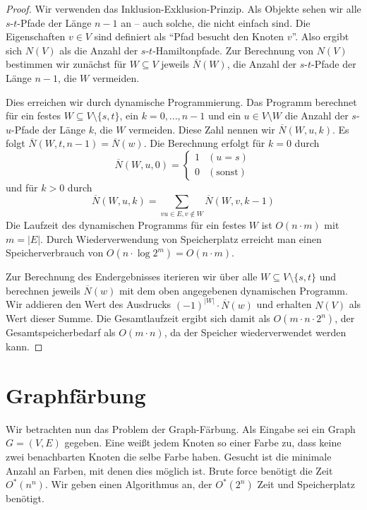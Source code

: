   \begin{proof}
    Wir verwenden das Inklusion-Exklusion-Prinzip. Als Objekte sehen wir alle \(s\)-\(t\)-Pfade der Länge \(n - 1\) an -- auch solche, die nicht einfach sind. Die Eigenschaften \(v \in V\) sind definiert als "`Pfad besucht den Knoten \(v\)"'. Also ergibt sich \(N(V)\) als die Anzahl der \(s\)-\(t\)-Hamiltonpfade. Zur Berechnung von \(N(V)\) bestimmen wir zunächst für \(W \subseteq V\) jeweils \(\overline{N}(W)\), die Anzahl der \(s\)-\(t\)-Pfade der Länge \(n - 1\), die \(W\) vermeiden. 
    
    Dies erreichen wir durch dynamische Programmierung. Das Programm berechnet für ein festes \(W \subseteq V \setminus \{s,t\}\), ein \(k = 0,...,n-1\) und ein \(u \in V \setminus W\) die Anzahl der \(s\)-\(u\)-Pfade der Länge \(k\), die \(W\) vermeiden. Diese Zahl nennen wir \(\overline{N}(W,u,k)\). Es folgt \(\overline{N}(W,t,n-1) = \overline{N}(w)\). Die Berechnung erfolgt für \(k = 0\) durch
    \[
      \overline{N}(W,u,0) = 
      \begin{cases}
        1 & (u = s) \\
        0 & (\text{sonst})
      \end{cases}
    \]
    und für \(k > 0\) durch
    \[
      \overline{N}(W,u,k) = \sum_{vu \in E, v \notin W} \overline{N}(W,v,k-1)
    \]
    Die Laufzeit des dynamischen Programms für ein festes \(W\) ist \( O(n \cdot m) \) mit \(m = |E|\). Durch Wiederverwendung von Speicherplatz erreicht man einen Speicherverbrauch von \( O(n \cdot \log 2^m ) = O(n \cdot m) \).
    
    Zur Berechnung des Endergebnisses iterieren wir über alle \(W \subseteq V \setminus \{s,t\}\) und berechnen jeweils \( \overline{N}(w) \) mit dem oben angegebenen dynamischen Programm. Wir addieren den Wert des Ausdrucks \( (-1)^{|W|} \cdot \overline{N}(w) \) und erhalten \(N(V)\) als Wert dieser Summe. Die Gesamtlaufzeit ergibt sich damit als \(O(m \cdot n \cdot 2^n)\), der Gesamtspeicherbedarf als \(O(m \cdot n)\), da der Speicher wiederverwendet werden kann.
  \end{proof}
  
\section{Graphfärbung}
  Wir betrachten nun das Problem der Graph-Färbung. Als Eingabe sei ein Graph \(G = (V,E)\) gegeben. Eine  weißt jedem Knoten so einer Farbe zu, dass keine zwei benachbarten Knoten die selbe Farbe haben. Gesucht ist die minimale Anzahl an Farben, mit denen dies möglich ist. Brute force benötigt die Zeit \( O^*(n^n) \). Wir geben einen Algorithmus an, der \(O^*(2^n)\) Zeit und Speicherplatz benötigt.
  
